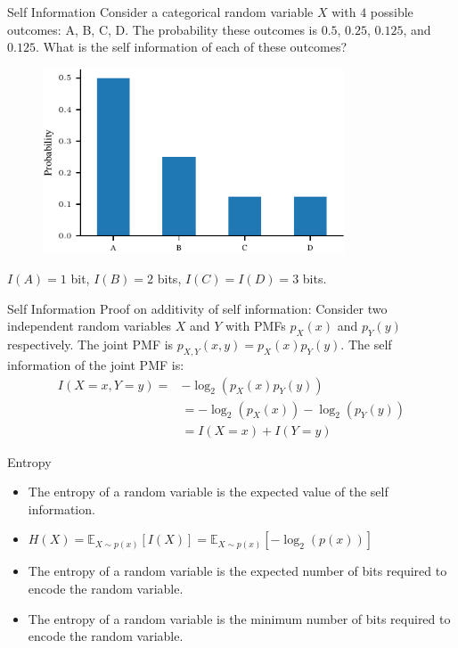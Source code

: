 \documentclass[handout]{beamer}
\begin{document}
\begin{frame}{Self Information}
    Consider a categorical random variable $X$ with $4$ possible outcomes: A, B, C, D. The probability these outcomes is $0.5$, $0.25$, $0.125$, and $0.125$. What is the self information of each of these outcomes?
    \begin{figure}
        \centering
        \includegraphics[width=0.8\textwidth]{../figures/information-theory/categorical-nonuniform.pdf}
        \label{fig:self_info_categorical_nonuniform}
    \end{figure}

    $I(A) = 1$ bit, $I(B) = 2$ bits, $I(C) = I(D) = 3$ bits.

\end{frame}

\begin{frame}{Self Information}
    Proof on additivity of self information:
    Consider two independent random variables $X$ and $Y$ with PMFs $p_X(x)$ and $p_Y(y)$ respectively. The joint PMF is $p_{X, Y}(x, y) = p_X(x)p_Y(y)$. The self information of the joint PMF is:
    \begin{align*}
        I(X=x, Y=y)=& -\log_2(p_X(x)p_Y(y)) \\
        &= -\log_2(p_X(x)) - \log_2(p_Y(y))\\ &= I(X=x) + I(Y=y)
    \end{align*}
    
\end{frame}

\begin{frame}{Entropy}
    \begin{itemize}
        \item The entropy of a random variable is the expected value of the self information.
        \item $H(X) = \mathbb{E}_{X \sim p(x)}[I(X)] = \mathbb{E}_{X \sim p(x)}[-\log_2(p(x))]$
        \item The entropy of a random variable is the expected number of bits required to encode the random variable.
        \item The entropy of a random variable is the minimum number of bits required to encode the random variable.
    \end{itemize}
    
\end{frame}
\end{document}
